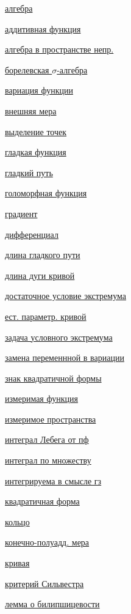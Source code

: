 \documentclass[a4paper]{article}
\theoremstyle{indented}
\theoremstyle{definition}
\theoremstyle{remark}
\begin{document}
\begin{multicols}{2}

    \hyperlink{47}{алгебра} \ 
    
    \hyperlink{44}{аддитивная функция} \ 
    
    \hyperlink{38}{алгебра в пространстве непр.} \ 
    
    \hyperlink{60}{борелевская $\sigma$-алгебра} \ 

    \hyperlink{1}{вариация функции} \ 

    \hyperlink{53}{внешняя мера} \ 

    \hyperlink{38}{выделение точек} \ 

    \hyperlink{18}{гладкая функция} \ 

    \hyperlink{7}{гладкий путь} \ 

    \hyperlink{37}{голоморфная функция} \ 

    \hyperlink{22}{градиент} \ 

    \hyperlink{14}{дифференциал} \ 

    \hyperlink{9}{длина гладкого пути} \ 

    \hyperlink{5}{длина дуги кривой} \ 

    \hyperlink{29}{достаточное условие экстремума} \ 

    \hyperlink{6}{ест. параметр. кривой} \ 

    \hyperlink{34}{задача условного экстремума} \ 

    \hyperlink{3}{замена переменнной в вариации} \ 

    \hyperlink{28}{знак квадратичной формы} \ 

    \hyperlink{63}{измеримая функция} \ 

    \hyperlink{62}{измеримое пространства} \ 

    \hyperlink{49}{интеграл Лебега от пф} \ 

    \hyperlink{65}{интеграл по множеству} \ 

    \hyperlink{42}{интегрируема в смысле гз} \ 

    \hyperlink{27}{квадратичная форма} \ 

    \hyperlink{46}{кольцо} \ 

    \hyperlink{54}{конечно-полуадд. мера} \ 

    \hyperlink{4}{кривая} \ 

    \hyperlink{30}{критерий Сильвестра} \ 

    \hyperlink{20}{лемма о билипшицевости} \ 


\end{multicols}
\end{document}
